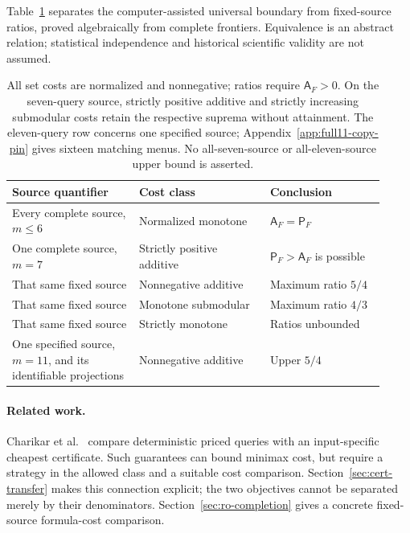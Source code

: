\documentclass[pdflatex,sn-mathphys-num]{sn-jnl}
\newcommand{\A}{\mathsf{A}}
\newcommand{\Pcost}{\mathsf{P}}
\theoremstyle{thmstyleone}
\theoremstyle{thmstylethree}
\theoremstyle{thmstyletwo}
\begin{document}
Table~\ref{tab:scope} separates the computer-assisted universal boundary from fixed-source ratios, proved algebraically from complete frontiers. Equivalence is an abstract relation; statistical independence and historical scientific validity are not assumed.

\begin{table}[ht]
\centering\small
\begin{tabular}{@{}>{\raggedright\arraybackslash}p{0.31\linewidth}p{0.32\linewidth}p{0.29\linewidth}@{}}\toprule
Source quantifier & Cost class & Conclusion\\\midrule
Every complete source, \mbox{$m\leq6$} & Normalized monotone & $\A_F=\Pcost_F$\\
One complete source, $m=7$ & Strictly positive additive & $\Pcost_F>\A_F$ is possible\\
That same fixed source & Nonnegative additive & Maximum ratio $5/4$\\
That same fixed source & Monotone submodular & Maximum ratio $4/3$\\
That same fixed source & Strictly monotone & Ratios unbounded\\
One specified source, \mbox{$m=11$}, and its identifiable projections & Nonnegative additive & Upper $5/4$\\\bottomrule
\end{tabular}
\caption{All set costs are normalized and nonnegative; ratios require $\A_F>0$. On the seven-query source, strictly positive additive and strictly increasing submodular costs retain the respective suprema without attainment. The eleven-query row concerns one specified source; Appendix~\ref{app:full11-copy-pin} gives sixteen matching menus. No all-seven-source or all-eleven-source upper bound is asserted.}\label{tab:scope}
\end{table}

\paragraph*{Related work.}
Charikar et al.~\cite{charikar02} compare deterministic priced queries with an input-specific cheapest certificate. Such guarantees can bound minimax cost, but require a strategy in the allowed class and a suitable cost comparison. Section~\ref{sec:cert-transfer} makes this connection explicit; the two objectives cannot be separated merely by their denominators. Section~\ref{sec:ro-completion} gives a concrete fixed-source formula-cost comparison.
\end{document}
